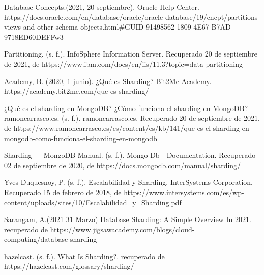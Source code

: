 \documentclass{article}
\begin{document}
\begin{thebibliography}{XXX00000}

    Database Concepts.(2021, 20 septiembre). Oracle Help Center. https://docs.oracle.com/en/database/oracle/oracle-database/19/cncpt/partitions-views-and-other-schema-objects.html#GUID-91498562-1809-4E67-B7AD-9718ED60DEFFw3
    
     Partitioning. (s. f.). InfoSphere Information Server. Recuperado 20 de septiembre de 2021, de https://www.ibm.com/docs/en/iis/11.3?topic=data-partitioning

    Academy, B. (2020, 1 junio). ¿Qué es Sharding? Bit2Me Academy. https://academy.bit2me.com/que-es-sharding/
  
    
     ¿Qué es el sharding en MongoDB? ¿Cómo funciona el sharding en MongoDB? | ramoncarrasco.es. (s. f.). ramoncarrasco.es. Recuperado 20 de septiembre de 2021, de https://www.ramoncarrasco.es/es/content/es/kb/141/que-es-el-sharding-en-mongodb-como-funciona-el-sharding-en-mongodb
  
    
 
     Sharding — MongoDB Manual. (s. f.). Mongo Db - Documentation. Recuperado 02 de septiembre de 2020, de https://docs.mongodb.com/manual/sharding/


     Yves Duquesnoy, P. (s. f.). Escalabilidad y Sharding. InterSystems Corporation. Recuperado 15 de febrero de 2018, de https://www.intersystems.com/es/wp-content/uploads/sites/10/Escalabilidad_y_Sharding.pdf
    
      Sarangam, A.(2021 31 Marzo) Database Sharding: A Simple Overview In 2021. recuperado de https://www.jigsawacademy.com/blogs/cloud-computing/database-sharding

    
     hazelcast. (s. f.). What Is Sharding?. recuperado de https://hazelcast.com/glossary/sharding/
    
 \end{thebibliography}
    
    
\end{document}
